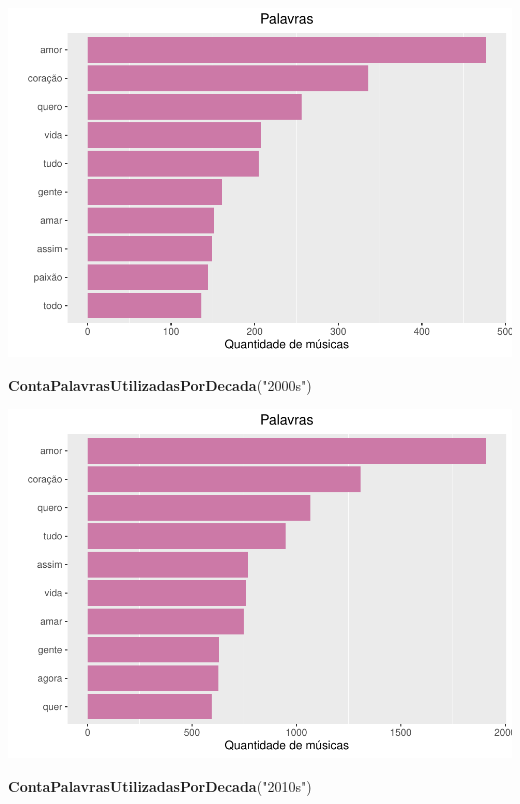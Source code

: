 \documentclass[]{article}
\newenvironment{Shaded}{\begin{snugshade}}{\end{snugshade}}
\newcommand{\KeywordTok}[1]{\textcolor[rgb]{0.13,0.29,0.53}{\textbf{#1}}}
\newcommand{\NormalTok}[1]{#1}
\newcommand{\StringTok}[1]{\textcolor[rgb]{0.31,0.60,0.02}{#1}}
\begin{document}
\includegraphics{avaliacaoLetrasDeForro_files/figure-latex/unnamed-chunk-5-5.pdf}

\begin{Shaded}
\begin{Highlighting}[]
\KeywordTok{ContaPalavrasUtilizadasPorDecada}\NormalTok{(}\StringTok{"2000s"}\NormalTok{)}
\end{Highlighting}
\end{Shaded}

\includegraphics{avaliacaoLetrasDeForro_files/figure-latex/unnamed-chunk-5-6.pdf}

\begin{Shaded}
\begin{Highlighting}[]
\KeywordTok{ContaPalavrasUtilizadasPorDecada}\NormalTok{(}\StringTok{"2010s"}\NormalTok{)}
\end{Highlighting}
\end{Shaded}
\end{document}
